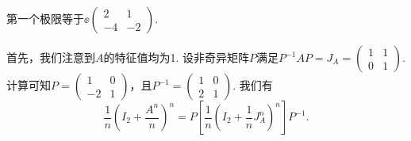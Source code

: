 \begin{solution}
  第一个极限等于$\ee\begin{pmatrix}
    2 & 1 \\
    -4 & -2
  \end{pmatrix}$.

  首先，我们注意到$A$的特征值均为1. 设非奇异矩阵$P$满足$P^{-1}AP=J_A=\begin{pmatrix}
    1 & 1 \\
    0 & 1
  \end{pmatrix}$. 计算可知$P=\begin{pmatrix}
    1 & 0 \\
    -2 & 1
  \end{pmatrix}$，且$P^{-1}=\begin{pmatrix}
    1 & 0 \\
    2 & 1
  \end{pmatrix}$. 我们有
  \[
    \frac1n \left( I_2 + \frac{A^n}n \right)^n = P\left[ \frac1n \left( I_2 + \frac1nJ_A^n \right)^n \right] P^{-1}.
  \]


\end{solution}
